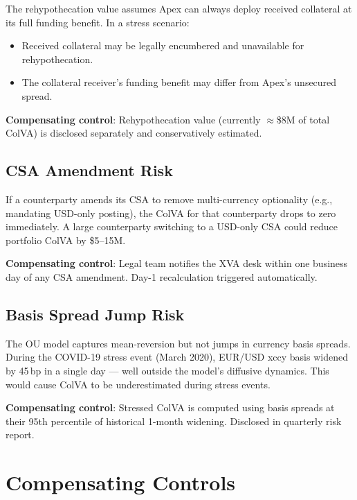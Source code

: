 \documentclass[11pt,a4paper]{article}
\begin{document}
The rehypothecation value assumes Apex can always deploy received collateral at its full
funding benefit. In a stress scenario:
\begin{itemize}[leftmargin=*]
  \item Received collateral may be legally encumbered and unavailable for rehypothecation.
  \item The collateral receiver's funding benefit may differ from Apex's unsecured spread.
\end{itemize}

\textbf{Compensating control}: Rehypothecation value (currently $\approx$\$8M of total ColVA)
is disclosed separately and conservatively estimated.

\subsection{CSA Amendment Risk}

If a counterparty amends its CSA to remove multi-currency optionality (e.g., mandating USD-only
posting), the ColVA for that counterparty drops to zero immediately. A large counterparty
switching to a USD-only CSA could reduce portfolio ColVA by \$5--15M.

\textbf{Compensating control}: Legal team notifies the XVA desk within one business day of any
CSA amendment. Day-1 recalculation triggered automatically.

\subsection{Basis Spread Jump Risk}

The OU model captures mean-reversion but not jumps in currency basis spreads. During the
COVID-19 stress event (March 2020), EUR/USD xccy basis widened by 45\,bp in a single day ---
well outside the model's diffusive dynamics. This would cause ColVA to be underestimated during
stress events.

\textbf{Compensating control}: Stressed ColVA is computed using basis spreads at their 95th
percentile of historical 1-month widening. Disclosed in quarterly risk report.

\section{Compensating Controls}
\end{document}
